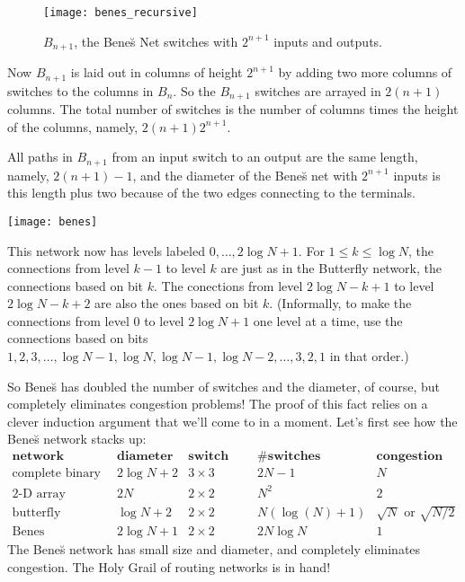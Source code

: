 \begin{figure}
\texttt{[image: benes\_recursive]}
\caption{$B_{n+1}$, the Bene\u{s} Net switches with $2^{n+1}$ inputs
and outputs.}
\label{fig:benes-recursive}
\end{figure}

Now $B_{n+1}$ is laid out in columns of height $2^{n+1}$ by adding two
more columns of switches to the columns in $B_n$.  So the $B_{n+1}$
switches are arrayed in $2(n+1)$ columns.  The total number of
switches is the number of columns times the height of the columns,
namely, $2(n+1)2^{n+1}$.

All paths in $B_{n+1}$ from an input switch to an output are the same
length, namely, $2(n+1)-1$, and the diameter of the Bene\u{s} net with
$2^{n+1}$ inputs is this length plus two because of the two edges
connecting to the terminals.

\begin{staffnotes}

\texttt{[image: benes]}


This network now has levels labeled $0,\dots ,2 \log N + 1$. For $1 \leq k
\leq \log N$, the connections from level $k-1$ to level $k$ are just as in
the Butterfly network, the connections based on bit $k$. The conections
from level $2 \log N - k + 1$ to level $2 \log N - k + 2$ are also the
ones based on bit $k$.  (Informally, to make the connections from level
$0$ to level $2 \log N +1$ one level at a time, use the connections based
on bits $1,2,3,\dots, \log N - 1, \log N, \log N - 1, \log N - 2, \dots,
3,2,1$ in that order.)

\end{staffnotes}

So Bene\u{s} has doubled the number of switches and the diameter, of
course, but completely eliminates congestion problems!  The proof of
this fact relies on a clever induction argument that we'll come to in
a moment.  Let's first see how the Bene\u{s} network stacks up:
%
\[
\begin{array}{r|c|c|c|c}
\textbf{network} &
\textbf{diameter} &
\textbf{switch size} &
\textbf{\# switches} &
\textbf{congestion} \\ \hline
\text{complete binary tree} & 2 \log N + 2 & 3 \times 3 & 2N - 1 & N \\
\text{2-D array} & 2 N & 2 \times 2 & N^2 & 2 \\
\text{butterfly} & \log N + 2 & 2 \times 2 & N (\log(N) + 1) & \sqrt{N} \text{ or } \sqrt{N/2} \\
\text{Bene\u{s}} & 2 \log N + 1 & 2 \times 2 &  2 N \log N & 1
\end{array}
\]
%
The Bene\u{s} network has small size and diameter, and completely
eliminates congestion.  The Holy Grail of routing networks is in hand!

